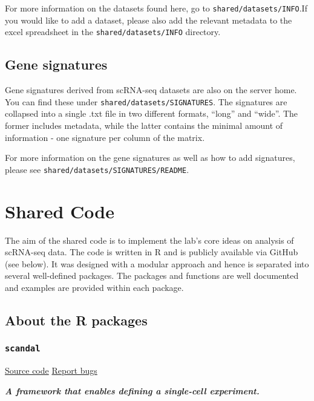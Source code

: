 \documentclass[
]{book}
\begin{document}
For more information on the datasets found here, go to \texttt{shared/datasets/INFO}.If you would like to add a dataset, please also add the relevant metadata to the excel spreadsheet in the \texttt{shared/datasets/INFO} directory.

\hypertarget{gene-signatures}{%
\section{Gene signatures}\label{gene-signatures}}

Gene signatures derived from scRNA-seq datasets are also on the server home. You can find these under \texttt{shared/datasets/SIGNATURES}. The signatures are collapsed into a single .txt file in two different formats, ``long'' and ``wide''. The former includes metadata, while the latter contains the minimal amount of information - one signature per column of the matrix.

For more information on the gene signatures as well as how to add signatures, please see \texttt{shared/datasets/SIGNATURES/README}.

\hypertarget{sharedCode}{%
\chapter{Shared Code}\label{sharedCode}}

The aim of the shared code is to implement the lab's core ideas on analysis of scRNA-seq data. The code is written in R and is publicly available via GitHub (see below). It was designed with a modular approach and hence is separated into several well-defined packages. The packages and functions are well documented and examples are provided within each package.

\hypertarget{about-the-r-packages}{%
\section{About the R packages}\label{about-the-r-packages}}

\hypertarget{scandal}{%
\subsection{\texorpdfstring{\texttt{scandal}}{scandal}}\label{scandal}}

\href{https://github.com/dravishays/scandal}{Source code} \textbar{} \href{https://github.com/dravishays/scandal/issues}{Report bugs}

\emph{\textbf{A framework that enables defining a single-cell experiment.}}
\end{document}
